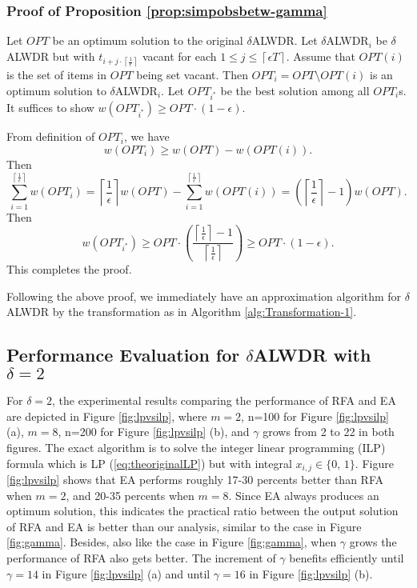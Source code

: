 \documentclass[11pt,english,onecolumn,draftcls]{IEEEtran}
\theoremstyle{plain}
\theoremstyle{plain}
\theoremstyle{plain}
\theoremstyle{plain}
\begin{document}
\subsubsection*{Proof of Proposition \ref{prop:simpobsbetw-gamma}}
\begin{IEEEproof}
Let $OPT$ be an optimum solution to the original $\delta$ALWDR.
Let $\delta$ALWDR$_{i}$ be $\delta$ALWDR but with $t_{i+j\cdot\left\lceil \frac{1}{\epsilon}\right\rceil }$
vacant for each $1\leq j\leq\left\lceil \epsilon T\right\rceil $.
Assume that $OPT(i)$ is the set of items in $OPT$ being set vacant.
Then $OPT_{i}=OPT\setminus OPT(i)$ is an optimum solution to $\delta$ALWDR$_{i}$.
Let $OPT_{i^{*}}$ be the best solution among all $OPT_{i}$s. It
suffices to show $w(OPT_{i^{*}})\geq OPT\cdot(1-\epsilon)$.

From definition of $OPT_{i}$, we have
\[
w(OPT_{i})\geq w(OPT)-w(OPT(i)).
\]
Then
\[
\sum_{i=1}^{\left\lceil \frac{1}{\epsilon}\right\rceil }w(OPT_{i})=\left\lceil \frac{1}{\epsilon}\right\rceil w(OPT)-\sum_{i=1}^{\left\lceil \frac{1}{\epsilon}\right\rceil }w(OPT(i))=(\left\lceil \frac{1}{\epsilon}\right\rceil -1)w(OPT).
\]
Then
\[
w(OPT_{i^{*}})\geq OPT\cdot(\frac{\left\lceil \frac{1}{\epsilon}\right\rceil -1}{\left\lceil \frac{1}{\epsilon}\right\rceil })\geq OPT\cdot(1-\epsilon).
\]
This completes the proof.
\end{IEEEproof}
Following the above proof, we immediately have an approximation algorithm
for $\delta$ALWDR by the transformation as in Algorithm \ref{alg:Transformation-1}.


\subsection*{Performance Evaluation for $\delta$\textmd{\normalsize{}ALWDR} with
$\delta=2$}

For $\delta=2$, the experimental results comparing the performance
of RFA and EA are depicted in Figure \ref{fig:lpvsilp}, where $m=2$,
n=100 for Figure \ref{fig:lpvsilp} (a), $m=8$, n=200 for Figure
\ref{fig:lpvsilp} (b), and $\gamma$ grows from 2 to 22 in both figures.
The exact algorithm is to solve the integer linear programming (ILP)
formula which is LP (\ref{eq:theoriginalLP}) but with integral $x_{i,j}\in\{0,\,1\}$.
Figure \ref{fig:lpvsilp} shows that EA performs roughly 17-30 percents
better than RFA when $m=2$, and 20-35 percents when $m=8$. Since
EA always produces an optimum solution, this indicates the practical
ratio between the output solution of RFA and EA is better than our
analysis, similar to the case in Figure \ref{fig:gamma}. Besides,
also like the case in Figure \ref{fig:gamma}, when $\gamma$ grows
the performance of RFA also gets better. The increment of $\gamma$
benefits efficiently until $\gamma=14$ in Figure \ref{fig:lpvsilp}
(a) and until $\gamma=16$ in Figure \ref{fig:lpvsilp} (b).
\end{document}
